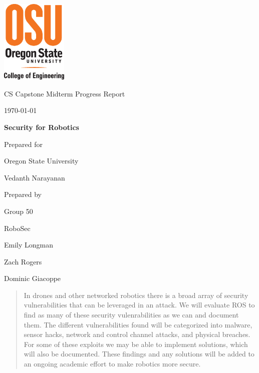 \documentclass[IEEEtran,letterpaper,10pt,notitlepage,draftclsnofoot,onecolumn]{article}
\def \CapstoneTeamName{   RoboSec}
\def \CapstoneTeamNumber{   50}
\def \GroupMemberOne{     Emily Longman}
\def \GroupMemberTwo{     Zach Rogers}
\def \GroupMemberThree{     Dominic Giacoppe}
\def \CapstoneProjectName{    Security for Robotics}
\def \CapstoneSponsorCompany{ Oregon State University}
\def \CapstoneSponsorPerson{    Vedanth Narayanan}
\def \DocType{    %
        Midterm Progress Report
        }
\newcommand{\NameSigPair}[1]{\par
\makebox[2.75in][r]{#1} \hfil   \makebox[3.25in]{\makebox[2.25in]{\hrulefill} \hfill    \makebox[.75in]{\hrulefill}}
\par\vspace{-12pt} \textit{\tiny\noindent
\makebox[2.75in]{} \hfil    \makebox[3.25in]{\makebox[2.25in][r]{Signature} \hfill  \makebox[.75in][r]{Date}}}}
\renewcommand{\NameSigPair}[1]{#1}
\begin{document}
\begin{titlepage}
    \begin{singlespace}
      \includegraphics[height=4cm]{coe_v_spot1}
        \hfill
        \par\vspace{.2in}
        \centering
        \scshape{
            \huge CS Capstone \DocType \par
            {\large\today}\par
            \vspace{.5in}
            \textbf{\Huge\CapstoneProjectName}\par
            \vfill
            {\large Prepared for}\par
            \Huge \CapstoneSponsorCompany\par
            \vspace{10pt}
            {\Large\NameSigPair{\CapstoneSponsorPerson}\par}
            {\large Prepared by }\par
            Group\CapstoneTeamNumber\par
            \CapstoneTeamName\par
            \vspace{10pt}
            {\Large
                \NameSigPair{\GroupMemberOne}\par
                \NameSigPair{\GroupMemberTwo}\par
                \NameSigPair{\GroupMemberThree}\par
            }
            \vspace{20pt}
        }
        \begin{abstract}
          In drones and other networked robotics there is a broad array of security vulnerabilities that can be leveraged in an attack.
          We will evaluate ROS to find as many of these security vulenrabilities as we can and document them.
          The different vulnerabilities found will be categorized into malware, sensor hacks, network and control channel attacks, and physical breaches.
          For some of these exploits we may be able to implement solutions, which will also be documented.
          These findings and any solutions will be added to an ongoing academic effort to make robotics more secure.
        \end{abstract}
    \end{singlespace}
\end{titlepage}
\end{document}
